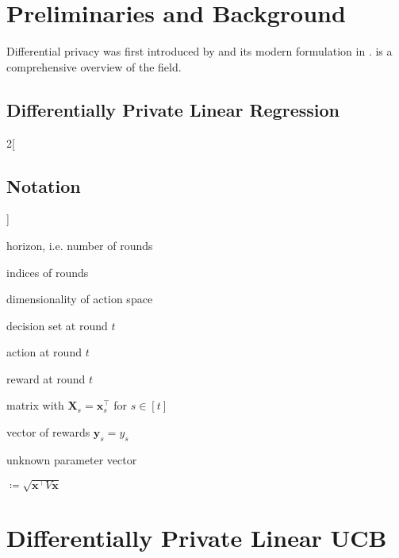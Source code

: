 \documentclass{article}
\renewcommand{\vec}[1]{\bm{#1}}
\newcommand{\defeq}{\coloneq}
\newcommand{\Real}{\mathds{R}}
\providecommand\transp{\top}
\let\transpsymbol\transp
\renewcommand{\transp}[1]{#1^\transpsymbol}
\newcommand{\Dset}[1]{\mathcal{D}_{#1}}
\begin{document}
\section{Preliminaries and Background}
\label{sec:background}

Differential privacy was first introduced by
\citet{DworkCalibratingNoiseSensitivity2006} and its modern
formulation in \citet{DworkDifferentialPrivacy2006}.
 is a comprehensive
overview of the field.





\subsection{Differentially Private Linear Regression}
\label{sec:dp-regression}

\begin{multicols}{2}[\subsection{Notation}\label{sec:notation}]
  \nolinenumbers
  \begin{description}[style=sameline,leftmargin=5em]
  \item[$n$] horizon, i.e. number of rounds
  \item[$s,t$] indices of rounds
  \item[$d$] dimensionality of action space
  \item[$\Dset{t}\subset\Real^d$] decision set at round $t$
  \item[$\vec x_t \in \Dset{t}$] action at round $t$
  \item[$y_t \in \Real$] reward at round $t$
  \item[$\vec X_t \in \Real^{t\times d}$] matrix with $\vec X_s = \transp{\vec
      x_s}$ for $s\in[t]$
  \item[$\vec y_t \in \Real^t$] vector of rewards $\vec y_s = y_s$
  \item[$\vec\theta^* \in \Real^d$] unknown parameter vector
  \item[$\norm{V}{\vec x}$] $\defeq \sqrt{\transp{\vec x} V \vec x}$
  \end{description}
  \linenumbers
\end{multicols}

\section{Differentially Private Linear UCB}
\end{document}
